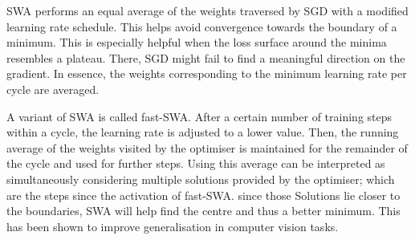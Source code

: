 SWA performs an equal average of the weights traversed by SGD with a modified learning rate schedule. This helps avoid convergence towards the boundary of a minimum. This is especially helpful when the loss surface around the minima resembles a plateau. There, SGD might fail to find a meaningful direction on the gradient. In essence, the weights corresponding to the minimum learning rate per cycle are averaged. \cite{Izmailov2018Averaging}

A variant of SWA is called fast-SWA. After a certain number of training steps within a cycle, the learning rate is adjusted to a lower value. Then, the running average of the weights visited by the optimiser is maintained for the remainder of the cycle and used for further steps. Using this average can be interpreted as simultaneously considering multiple solutions provided by the optimiser; which are the steps since the activation of fast-SWA. since those Solutions lie closer to the boundaries, SWA will help find the centre and thus a better minimum. This has been shown to improve generalisation in computer vision tasks. \cite{Athiwaratkun2018There}
